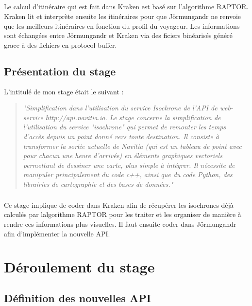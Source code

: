 \documentclass[a4paper]{report}
\begin{document}
\paragraph{} Le calcul d'itinéraire qui est fait dans Kraken est basé sur l'algorithme RAPTOR. Kraken lit et interprète ensuite les itinéraires pour que Jörmungandr ne renvoie que les meilleurs itinéraires en fonction du profil du voyageur. Les informations sont échangées entre Jörmungandr et Kraken via des ficiers binéarisés généré grace à des fichiers en protocol buffer.

\section{Présentation du stage}

L'intitulé de mon stage était le suivant :

\begin{quote}
	\emph{"Simplification dans l’utilisation du service Isochrone de l’API de web-service http://api.navitia.io. Le stage concerne la simplification de l’utilisation du service 		"isochrone" qui permet de remonter les temps d'accès depuis un point donné vers toute destination. Il consiste à transformer la sortie actuelle de Navitia (qui est un tableau de 		point avec pour chacun une heure d'arrivée) en éléments graphiques vectoriels permettant de dessiner une carte, plus simple à intégrer. Il nécessite de manipuler principalement du 		code c++, ainsi que du code Python, des librairies de cartographie et des bases de données."}
\end{quote}

\paragraph{} Ce stage implique de coder dans Kraken afin de récupérer les isochrones déjà calculés par lalgorithme RAPTOR pour les traiter et les organiser de manière à rendre ces informations plus visuelles. Il faut ensuite coder dans Jörmungandr afin d'implémenter la nouvelle API. 

\chapter{Déroulement du stage}

\section{Définition des nouvelles API}
\end{document}
